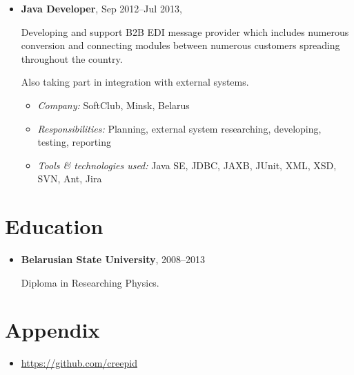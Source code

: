 \documentclass[a4paper, 12pt]{article}
\newcommand{\position}[1]{
    \textbf{#1}}
\newcommand{\itemlabel}[1]{
    \textit{#1:}}
\begin{document}
    \begin{itemize}

        \item \position{Java Developer}, Sep 2012--Jul 2013, 

            Developing and support B2B EDI message provider which includes numerous conversion and connecting modules between numerous customers spreading throughout the country.

            Also taking part in integration with external systems.

            \begin{itemize}
                \item \itemlabel{Company} SoftClub, Minsk, Belarus
                \item \itemlabel{Responsibilities} Planning, external system researching, developing, testing, reporting
                \item \itemlabel{Tools \& technologies used} Java SE, JDBC, JAXB, JUnit, XML, XSD, SVN, Ant, Jira
            \end{itemize}

    \end{itemize}


\section*{Education}

    \begin{itemize}

        \item \position{Belarusian State University}, 2008--2013

            Diploma in Researching Physics.

    \end{itemize}

\section*{Appendix}

    \begin{itemize}
        \item \href{https://github.com/creepid}{https://github.com/creepid}
    \end{itemize}
\end{document}
